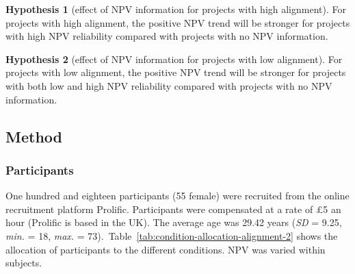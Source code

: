 \documentclass[
  english,
  man, donotrepeattitle,floatsintext]{apa7}
\theoremstyle{definition}
\theoremstyle{definition}
\theoremstyle{definition}
\theoremstyle{definition}
\newtheorem{hypothesis}{Hypothesis}
\theoremstyle{remark}
\begin{document}
\begin{hypothesis}[effect of NPV information for projects with high alignment]
\protect\hypertarget{hyp:allocation-alignment-high-no-NPV-alignment-2}{}{\label{hyp:allocation-alignment-high-no-NPV-alignment-2} \iffalse (effect of NPV information for projects with high alignment) \fi{} }For projects with high alignment, the positive NPV trend will be stronger for
projects with high NPV reliability compared with projects with no NPV
information.
\end{hypothesis}

\begin{hypothesis}[effect of NPV information for projects with low alignment]
\protect\hypertarget{hyp:allocation-alignment-low-no-NPV-alignment-2}{}{\label{hyp:allocation-alignment-low-no-NPV-alignment-2} \iffalse (effect of NPV information for projects with low alignment) \fi{} }For projects with low alignment, the positive NPV trend will be stronger for
projects with both low and high NPV reliability compared with projects with no
NPV information.
\end{hypothesis}

\hypertarget{method}{%
\subsection{Method}\label{method}}

\hypertarget{participants}{%
\subsubsection{Participants}\label{participants}}

One hundred and eighteen participants (55 female) were recruited from the online recruitment platform Prolific. Participants were compensated at a rate of \pounds 5 an hour (Prolific is based in the UK). The average age was 29.42 years (\emph{SD} = 9.25, \emph{min.} = 18, \emph{max.} = 73).~Table~\ref{tab:condition-allocation-alignment-2}
shows the allocation of participants to the different conditions. NPV was varied
within subjects.
\end{document}
